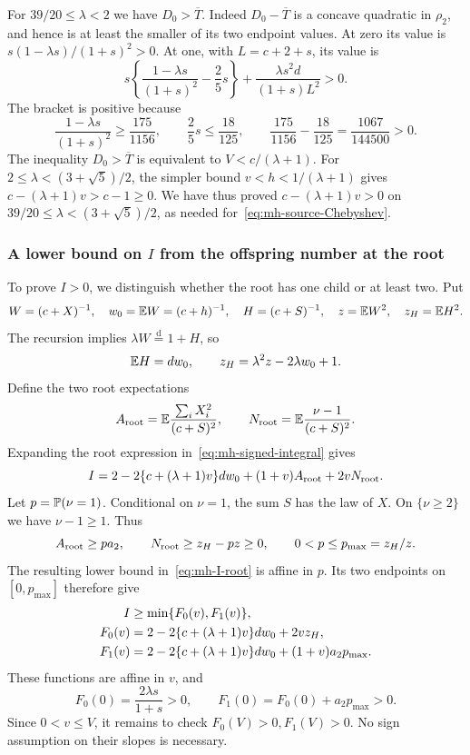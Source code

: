 For $39/20\le\lambda<2$ we have $D_0>\overline T$. Indeed $D_0-\overline T$ is a concave quadratic in $\rho_2$, and hence is at least the smaller of its two endpoint values. At zero its value is $s(1-\lambda s)/(1+s)^2>0$. At one, with $L=c+2+s$, its value is
\[
 s\left\{\frac{1-\lambda s}{(1+s)^2}-\frac25s\right\}
 +\frac{\lambda s^2d}{(1+s)L^2}>0.
\]
The bracket is positive because
\[
 \frac{1-\lambda s}{(1+s)^2}\ge\frac{175}{1156},\qquad
 \frac25s\le\frac{18}{125},\qquad
 \frac{175}{1156}-\frac{18}{125}=\frac{1067}{144500}>0.
\]
The inequality $D_0>\overline T$ is equivalent to $V<c/(\lambda+1)$. For $2\le\lambda<(3+\sqrt5)/2$, the simpler bound $v<h<1/(\lambda+1)$ gives
$c-(\lambda+1)v>c-1\ge0$. We have thus proved $c-(\lambda+1)v>0$ on $39/20\le\lambda<(3+\sqrt5)/2$, as needed for~\eqref{eq:mh-source-Chebyshev}.

\subsubsection{A lower bound on \texorpdfstring{$I$}{I} from the offspring number at the root}
To prove $I>0$, we distinguish whether the root has one child or at least two. Put
\[
 W=(c+X)^{-1},\quad w_0=\mathbb E W=(c+h)^{-1},\quad
 H=(c+S)^{-1},\quad z=\mathbb E W^2,\quad z_H=\mathbb E H^2.
\]
The recursion implies $\lambda W\overset{\mathrm d}=1+H$, so
\[
 \mathbb E H=d w_0,\qquad z_H=\lambda^2z-2\lambda w_0+1.
\]
Define the two root expectations
\[
 A_{\rm root}=\mathbb E\frac{\sum_iX_i^2}{(c+S)^2},\qquad
 N_{\rm root}=\mathbb E\frac{\nu-1}{(c+S)^2}.
\]
Expanding the root expression in~\eqref{eq:mh-signed-integral} gives
\begin{equation}\label{eq:mh-I-root}
 I=2-2\{c+(\lambda+1)v\}d w_0
             +(1+v)A_{\rm root}+2vN_{\rm root}.
\end{equation}
Let $p=\mathbb P(\nu=1)$. Conditional on $\nu=1$, the sum $S$ has the law of $X$. On $\{\nu\ge2\}$ we have $\nu-1\ge1$. Thus
\[
 A_{\rm root}\ge p a_2,\qquad
 N_{\rm root}\ge z_H-pz\ge0,\qquad 0<p\le p_{\max}=z_H/z.
\]
The resulting lower bound in~\eqref{eq:mh-I-root} is affine in $p$. Its two endpoints on $[0,p_{\max}]$ therefore give
\begin{align}\label{eq:mh-F-endpoints}
 I&\ge\min\{F_0(v),F_1(v)\},\notag\\
 F_0(v)&=2-2\{c+(\lambda+1)v\}d w_0+2vz_H,\notag\\
 F_1(v)&=2-2\{c+(\lambda+1)v\}d w_0+(1+v)a_2p_{\max}.
\end{align}
These functions are affine in $v$, and
\[
 F_0(0)=\frac{2\lambda s}{1+s}>0,\qquad F_1(0)=F_0(0)+a_2p_{\max}>0.
\]
Since $0<v\le V$, it remains to check $F_0(V)>0,F_1(V)>0$. No sign assumption on their slopes is necessary.

